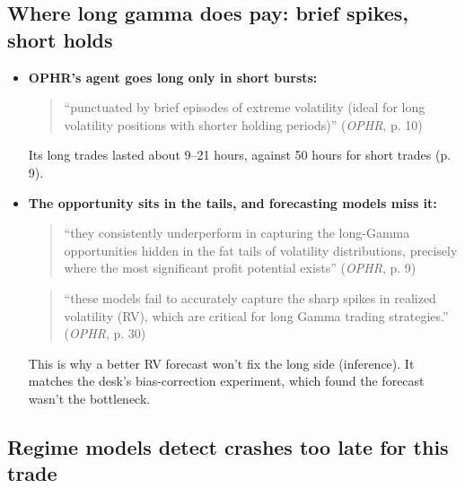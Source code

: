 \documentclass{article}
\begin{document}
\subsection{Where long gamma does pay: brief spikes, short holds}

\begin{itemize}

\item \textbf{OPHR's agent goes long only in short bursts:}

\begin{quote}``punctuated by brief episodes of extreme volatility (ideal for long volatility positions with shorter holding periods)'' (\emph{OPHR}, p. 10)\end{quote}

Its long trades lasted about 9--21 hours, against 50 hours for short trades (p. 9).

\item \textbf{The opportunity sits in the tails, and forecasting models miss it:}

\begin{quote}``they consistently underperform in capturing the long-Gamma opportunities hidden in the fat tails of volatility distributions, precisely where the most significant profit potential exists'' (\emph{OPHR}, p. 9)\end{quote}

\begin{quote}``these models fail to accurately capture the sharp spikes in realized volatility (RV), which are critical for long Gamma trading strategies.'' (\emph{OPHR}, p. 30)\end{quote}

This is why a better RV forecast won't fix the long side (inference). It matches the desk's bias-correction experiment, which found the forecast wasn't the bottleneck.

\end{itemize}

\subsection{Regime models detect crashes too late for this trade}
\end{document}
